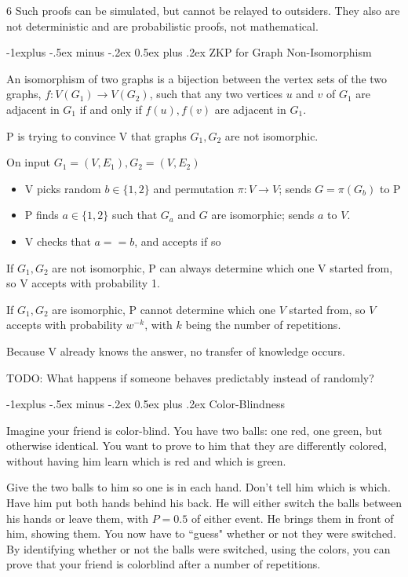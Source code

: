 \documentclass[2pt]{scrartcl}
\makeatletter
\renewcommand{\subsection}{\@startsection{subsection}{2}{0mm}
  {-1explus -.5ex minus -.2ex}
  {0.5ex plus .2ex}
{\normalfont\normalsize\bfseries}}
\makeatother
\begin{document}
\begin{multicols}{6}
  Such proofs can be simulated, but cannot be relayed to outsiders. They also are not deterministic and are probabilistic proofs, not mathematical.

  \subsection{ZKP for Graph Non-Isomorphism}

  An isomorphism of two graphs is a bijection between the vertex sets of the two graphs, $f: V(G_1) \rightarrow V(G_2)$, such that any two vertices $u$ and $v$ of $G_1$ are adjacent in $G_1$ if and only if $f(u), f(v)$ are adjacent in $G_1$.

  P is trying to convince V that graphs $G_1, G_2$ are not isomorphic.

  On input $G_1 = (V, E_1), G_2 = (V, E_2)$ 
  \begin{itemize}
    \item V picks random $b \in \{1, 2\}$ and permutation $\pi: V \rightarrow V$; sends $G = \pi(G_b)$ to P
    \item P finds $a \in \{1, 2\}$ such that $G_a$ and $G$ are isomorphic; sends $a$ to $V$.
    \item V checks that $a == b$, and accepts if so
  \end{itemize}

  If $G_1, G_2$ are not isomorphic, P can always determine which one V started from, so V accepts with probability 1.

  If $G_1, G_2$ are isomorphic, P cannot determine which one $V$ started from, so $V$ accepts with probability $w^{-k}$, with $k$ being the number of repetitions.

  Because V already knows the answer, no transfer of knowledge occurs.

  TODO: What happens if someone behaves predictably instead of randomly?

  \subsection{Color-Blindness}

  Imagine your friend is color-blind. You have two balls: one red, one green, but otherwise identical. You want to prove to him that they are differently colored, without having him learn which is red and which is green.

  Give the two balls to him so one is in each hand. Don't tell him which is which. Have him put both hands behind his back. He will either switch the balls between his hands or leave them, with $P = 0.5$ of either event. He brings them in front of him, showing them. You now have to ``guess" whether or not they were switched. By identifying whether or not the balls were switched, using the colors, you can prove that your friend is colorblind after a number of repetitions.


\end{multicols}
\end{document}
